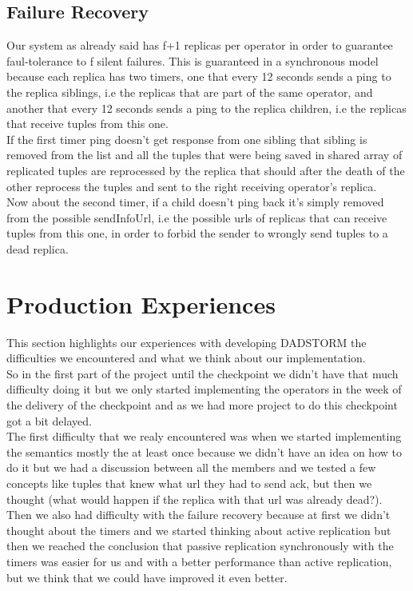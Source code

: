 \documentclass[times, 10pt, twocolumn]{article}
\begin{document}
\subsection{Failure Recovery}
Our system as already said has f+1 replicas per operator in order to guarantee faul-tolerance to f silent failures. This is guaranteed in a synchronous model because each replica has two timers, one that every 12 seconds sends a ping to the replica siblings, i.e the replicas that are part of the same operator, and another that every 12 seconds sends a ping to the replica children, i.e the replicas that receive tuples from this one.
\\If the first timer ping doesn't get response from one sibling that sibling is removed from the list and all the tuples that were being saved in shared array of replicated tuples are reprocessed by the replica that should after the death of the other reprocess the tuples and sent to the right receiving operator's replica.
\\Now about the second timer, if a child doesn't ping back it's simply removed from the possible sendInfoUrl, i.e the possible urls of replicas that can receive tuples from this one, in order to forbid the sender to wrongly send tuples to a dead replica.



\section{Production Experiences}
This section highlights our experiences with developing DADSTORM the difficulties we encountered and what we think about our implementation.
\\So in the first part of the project until the checkpoint we didn't have that much difficulty doing it but we only started implementing the operators in the week of the delivery of the checkpoint and as we had more project to do this checkpoint got a bit delayed.
\\The first difficulty that we realy encountered was when we started implementing the semantics mostly the at least once because we didn't have an idea on how to do it but we had a discussion between all the members and we tested a few concepts like tuples that knew what url they had to send ack, but then we thought (what would happen if the replica with that url was already dead?).
\\Then we also had difficulty with the failure recovery because at first we didn't thought about the timers and we started thinking about active replication but then we reached the conclusion that passive replication synchronously with the timers was easier for us and with a better performance than active replication, but we think that we could have improved it even better. 
\end{document}
